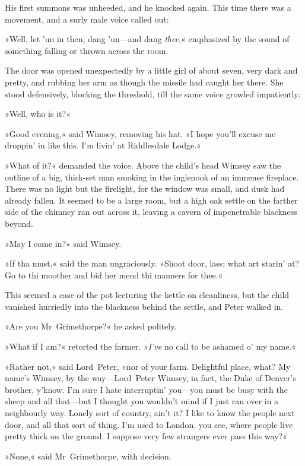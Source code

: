 His first summons was unheeded, and he knocked again. This time there was a movement, and a surly male voice called out:

»Well, let 'un in then, dang 'un—and dang \textit{thee},« emphasized by the sound of something falling or thrown across the room.

The door was opened unexpectedly by a little girl of about seven, very dark and pretty, and rubbing her arm as though the missile had caught her there. She stood defensively, blocking the threshold, till the same voice growled impatiently:

»Well, who is it?«

»Good evening,« said Wimsey, removing his hat. »I hope you'll excuse me droppin' in like this. I'm livin' at Riddlesdale Lodge.«

»What of it?« demanded the voice. Above the child's head Wimsey saw the outline of a big, thick-set man smoking in the inglenook of an immense fireplace. There was no light but the firelight, for the window was small, and dusk had already fallen. It seemed to be a large room, but a high oak settle on the farther side of the chimney ran out across it, leaving a cavern of impenetrable blackness beyond.

»May I come in?« said Wimsey.

»If tha must,« said the man ungraciously. »Shoot door, lass; what art starin' at? Go to thi moother and bid her mend thi manners for thee.«

This seemed a case of the pot lecturing the kettle on cleanliness, but the child vanished hurriedly into the blackness behind the settle, and Peter walked in.

»Are you Mr~Grimethorpe?« he asked politely.

»What if I am?« retorted the farmer. »\textit{I've} no call to be ashamed o' my name.«

»Rather not,« said Lord~Peter, »nor of your farm. Delightful place, what? My name's Wimsey, by the way—Lord~Peter Wimsey, in fact, the Duke of Denver's brother, y'know. I'm sure I hate interruptin' you—you must be busy with the sheep and all that—but I thought you wouldn't mind if I just ran over in a neighbourly way. Lonely sort of country, ain't it? I like to know the people next door, and all that sort of thing. I'm used to London, you see, where people live pretty thick on the ground. I suppose very few strangers ever pass this way?«

»None,« said Mr~Grimethorpe, with decision.

